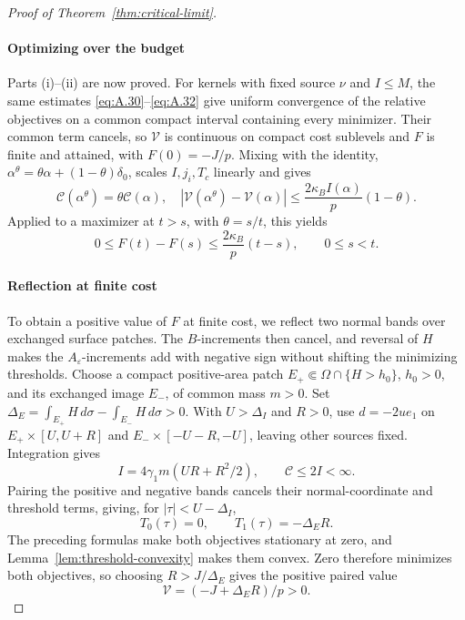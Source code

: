 \begin{proof}[Proof of Theorem~\ref{thm:critical-limit}]
\paragraph{Optimizing over the budget}\label{par:budget-optimization}

Parts (i)--(ii) are now proved. For kernels with fixed source \(\nu\) and \(I\le M\), the same estimates \eqref{eq:A.30}--\eqref{eq:A.32} give uniform convergence of the relative objectives on a common compact interval containing every minimizer. Their common term cancels, so \(\mathcal V\) is continuous on compact cost sublevels and \(F\) is finite and attained, with \(F(0)=-J/p\). Mixing with the identity, \(\alpha^\theta=\theta\alpha+(1-\theta)\delta_0\), scales \(I,j_i,T_c\) linearly and gives
\begin{equation}
\mathcal C(\alpha^\theta)=\theta\mathcal C(\alpha),\quad
|\mathcal V(\alpha^\theta)-\mathcal V(\alpha)|
\le\frac{2\kappa_BI(\alpha)}p(1-\theta).
\tag{A.43}\label{eq:A.43}
\end{equation}
Applied to a maximizer at \(t>s\), with \(\theta=s/t\), this yields
\begin{equation}
0\le F(t)-F(s)\le\frac{2\kappa_B}{p}(t-s),\qquad0\le s<t.
\tag{A.44}\label{eq:A.44}
\end{equation}

\paragraph{Reflection at finite cost}\label{par:reflection}
To obtain a positive value of \(F\) at finite cost, we reflect two normal bands over exchanged surface patches. The \(B\)-increments then cancel, and reversal of \(H\) makes the \(A_\varepsilon\)-increments add with negative sign without shifting the minimizing thresholds. Choose a compact positive-area patch \(E_+\Subset\Omega\cap\{H>h_0\}\), \(h_0>0\), and its exchanged image \(E_-\), of common mass \(m>0\). Set \(\Delta_E=\int_{E_+}H\,d\sigma-\int_{E_-}H\,d\sigma>0\). With \(U>\Delta_I\) and \(R>0\), use \(d=-2ue_1\) on \(E_+\times[U,U+R]\) and \(E_-\times[-U-R,-U]\), leaving other sources fixed. Integration gives
\begin{equation}
I=4\gamma_1m(UR+R^2/2),\qquad \mathcal C\le2I<\infty.
\tag{A.45}\label{eq:A.45}
\end{equation}
Pairing the positive and negative bands cancels their normal-coordinate and threshold terms, giving, for \(|\tau|<U-\Delta_I\),
\begin{equation}
T_0(\tau)=0,\qquad T_1(\tau)=-\Delta_E R.
\tag{A.46}\label{eq:A.46}
\end{equation}
The preceding formulas make both objectives stationary at zero, and Lemma~\ref{lem:threshold-convexity} makes them convex. Zero therefore minimizes both objectives, so choosing \(R>J/\Delta_E\) gives the positive paired value
\begin{equation}
\mathcal V=(-J+\Delta_E R)/p>0.
\tag{A.47}\label{eq:A.47}
\end{equation}


\end{proof}
